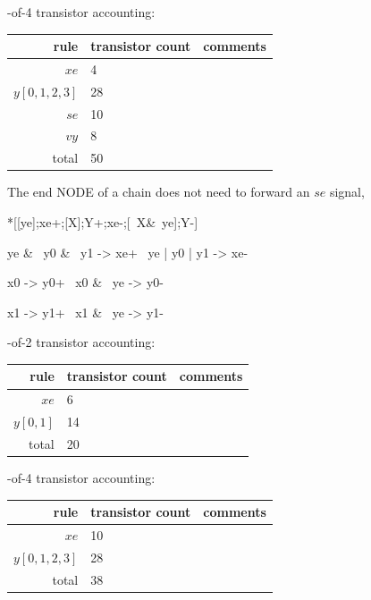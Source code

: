 \documentclass{article}
\begin{document}
-of-4 transistor accounting:

\begin{center}
    \begin{tabular}{|r|l|l|}
    \hline
    rule & transistor count & comments \\ \hline
    $xe$ & 4 & \\ \hline
    $y[0,1,2,3]$ & 28 & \\ \hline
    $se$ & 10 & \\ \hline
    $vy$ & 8 & \\ \hline
    \hline total & 50 & \\ \hline
    \end{tabular}
\end{center}

\noindent
The end NODE of a chain does not need to forward an $se$ signal,

\begin{hse}
*[[ye];xe+;[X];Y+;xe-;[~X&~ye];Y-]
\end{hse}

\begin{prs2}
ye & ~y0 & ~y1 -> xe+
~ye | y0 | y1 -> xe-
\end{prs2}

\begin{prs2}
x0 -> y0+
~x0 & ~ye -> y0-

x1 -> y1+
~x1 & ~ye -> y1-
\end{prs2}

-of-2 transistor accounting:

\begin{center}
    \begin{tabular}{|r|l|l|}
    \hline
    rule & transistor count & comments \\ \hline
    $xe$ & 6 & \\ \hline
    $y[0,1]$ & 14 & \\ \hline
    \hline total & 20 & \\ \hline
    \end{tabular}
\end{center}

-of-4 transistor accounting:

\begin{center}
    \begin{tabular}{|r|l|l|}
    \hline
    rule & transistor count & comments \\ \hline
    $xe$ & 10 & \\ \hline
    $y[0,1,2,3]$ & 28 & \\ \hline
    \hline total & 38 & \\ \hline
    \end{tabular}
\end{center}
\end{document}
